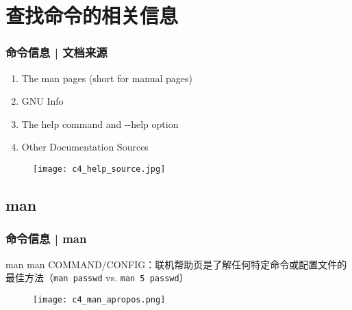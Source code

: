 \section{查找命令的相关信息}
\begin{frame}
  \frametitle{命令信息 | 文档来源}
  \begin{enumerate}
    \item The man pages (short for manual pages)
    \item GNU Info
    \item The help command and -\!-help option
    \item Other Documentation Sources
  \end{enumerate}
  \begin{figure}
    \centering
    \texttt{[image: c4\_help\_source.jpg]}
  \end{figure}
\end{frame}

\subsection{man}
\begin{frame}[fragile]
  \frametitle{命令信息 | man}
  \begin{block}{man}
    \alert{man COMMAND/CONFIG}：联机帮助页是了解任何特定命令或配置文件的最佳方法（\verb|man passwd| vs. \verb|man 5 passwd|）
  \end{block}
  \begin{figure}
    \centering
    \texttt{[image: c4\_man\_apropos.png]}
  \end{figure}
\end{frame}

